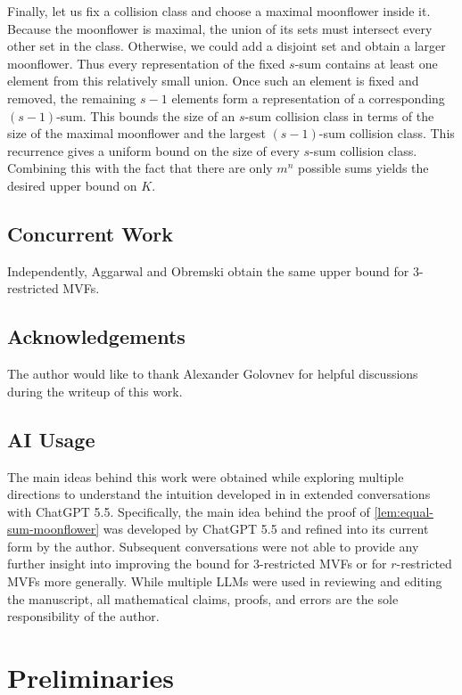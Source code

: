 \documentclass[11pt]{article}
\theoremstyle{definition}
\begin{document}
Finally, let us fix a collision class and choose a maximal moonflower inside it. Because the moonflower is maximal, the union of its sets must intersect every
other set in the class. Otherwise, we could add a disjoint set and obtain a
larger moonflower. Thus every representation of the fixed $s$-sum contains at
least one element from this relatively small union. Once such an element is
fixed and removed, the remaining $s-1$ elements form a representation of a
corresponding $(s-1)$-sum. This bounds the size of an $s$-sum collision class in
terms of the size of the maximal moonflower and the largest $(s-1)$-sum
collision class. This recurrence gives a uniform bound on the size of
every $s$-sum collision class. Combining this with the fact that there are only
$m^n$ possible sums yields the desired upper bound on $K$.



\subsection{Concurrent Work}
Independently, Aggarwal and Obremski \cite{AggarwalObremski2026} obtain the same upper bound for $3$-restricted MVFs.
\subsection*{Acknowledgements} The author would like to thank Alexander Golovnev for helpful discussions during the writeup of this work. 
\subsection*{AI Usage} The main ideas behind this work were obtained while exploring multiple directions to understand the intuition developed in \cite{aggarwal2025} in extended conversations with ChatGPT 5.5. Specifically, the main idea behind the proof of \cref{lem:equal-sum-moonflower} was developed by ChatGPT 5.5 and refined into its current form by the author. Subsequent conversations were not able to provide any further insight into improving the bound for $3$-restricted MVFs  or for $r$-restricted MVFs more generally. While multiple LLMs were used in reviewing and editing the manuscript, all mathematical claims, proofs, and errors
are the sole responsibility of the author.
\section{Preliminaries}\label{sec:prelim}
\end{document}
